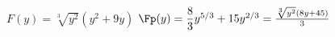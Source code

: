 {$F(y)=\sqrt[3]{y^2}(y^2 + 9y)$}
{$\Fp(y)=\dfrac83 y^{5/3}+15y^{2/3}=\frac{\sqrt[3]{y^2}(8y + 45)}3$}
